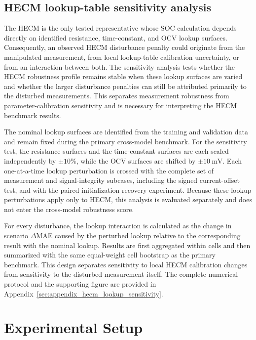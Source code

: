 \documentclass[review,nopreprintline]{elsarticle}
\begin{document}
\subsection{HECM lookup-table sensitivity analysis}
\label{sec:hecm_lookup_method}
The HECM is the only tested representative whose SOC calculation depends directly on identified resistance, time-constant, and OCV lookup surfaces. Consequently, an observed HECM disturbance penalty could originate from the manipulated measurement, from local lookup-table calibration uncertainty, or from an interaction between both. The sensitivity analysis tests whether the HECM robustness profile remains stable when these lookup surfaces are varied and whether the larger disturbance penalties can still be attributed primarily to the disturbed measurements. This separates measurement robustness from parameter-calibration sensitivity and is necessary for interpreting the HECM benchmark results.

The nominal lookup surfaces are identified from the training and validation data and remain fixed during the primary cross-model benchmark. For the sensitivity test, the resistance surfaces and the time-constant surfaces are each scaled independently by $\pm10\%$, while the OCV surfaces are shifted by $\pm\SI{10}{\milli\volt}$. Each one-at-a-time lookup perturbation is crossed with the complete set of measurement and signal-integrity subcases, including the signed current-offset test, and with the paired initialization-recovery experiment. Because these lookup perturbations apply only to HECM, this analysis is evaluated separately and does not enter the cross-model robustness score.

For every disturbance, the lookup interaction is calculated as the change in scenario $\Delta$MAE caused by the perturbed lookup relative to the corresponding result with the nominal lookup. Results are first aggregated within cells and then summarized with the same equal-weight cell bootstrap as the primary benchmark. This design separates sensitivity to local HECM calibration changes from sensitivity to the disturbed measurement itself. The complete numerical protocol and the supporting figure are provided in Appendix~\ref{sec:appendix_hecm_lookup_sensitivity}.

\section{Experimental Setup}
\end{document}
